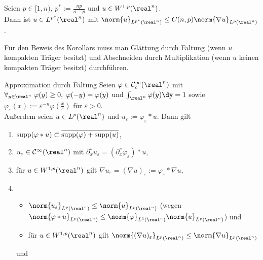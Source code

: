 \begin{Kor}
    Seien $p \in [1, n)$, $p^\ast := \frac{np}{n - p}$ und $u \in W^{1,p}(\real^n)$.\\
    Dann ist $u \in L^{p^\ast}(\real^n)$ mit
    $\norm{u}_{L^{p^\ast}(\real^n)} \le C(n,p) \norm{\nabla u}_{L^p(\real^n)}$.
\end{Kor}

\linie

\begin{Bem}
    Für den Beweis des Korollars muss man Glättung durch Faltung
    (wenn $u$ kompakten Träger besitzt) und Abschneiden durch Multiplikation
    (wenn $u$ keinen kompakten Träger besitzt) durchführen.
\end{Bem}

\begin{Lemma}{Approximation durch Faltung}
    Seien $\varphi \in \C^\infty_c(\real^n)$ mit\\
    $\forall_{y \in \real^n}\; \varphi(y) \ge 0,\; \varphi(-y) = \varphi(y)$ und
    $\int_{\real^n} \varphi(y)\dy = 1$ sowie
    $\varphi_\varepsilon(x) := \varepsilon^{-n} \varphi(\frac{x}{\varepsilon})$
    für $\varepsilon > 0$.\\
    Außerdem seien $u \in L^p(\real^n)$ und $u_\varepsilon := \varphi_\varepsilon \ast u$.
    Dann gilt
    \begin{enumerate}
        \item
        $\operatorname{supp}(\varphi \ast u) \subset \overline{\operatorname{supp}(\varphi) + \operatorname{supp}(u)}$,
        
        \item
        $u_\varepsilon \in \C^\infty(\real^n)$ mit
        $\partial_x^s u_\varepsilon = (\partial_x^s \varphi_\varepsilon) \ast u$,
        
        \item
        für $u \in W^{1,p}(\real^n)$ gilt
        $\nabla u_\varepsilon = (\nabla u)_\varepsilon := \varphi_\varepsilon \ast \nabla u$,
        
        \item
        \begin{itemize}
            \item
            $\norm{u_\varepsilon}_{L^p(\real^n)} \le \norm{u}_{L^p(\real^n)}$
            (wegen $\norm{\varphi \ast u}_{L^p(\real^n)} \le
            \norm{\varphi}_{L^1(\real^n)} \norm{u}_{L^p(\real^n)}$) und
            
            \item
            für $u \in W^{1,p}(\real^n)$ gilt
            $\norm{(\nabla u)_\varepsilon}_{L^p(\real^n)} \le \norm{\nabla u}_{L^p(\real^n)}$
        \end{itemize}
        und
        

\end{enumerate}
\end{Lemma}
